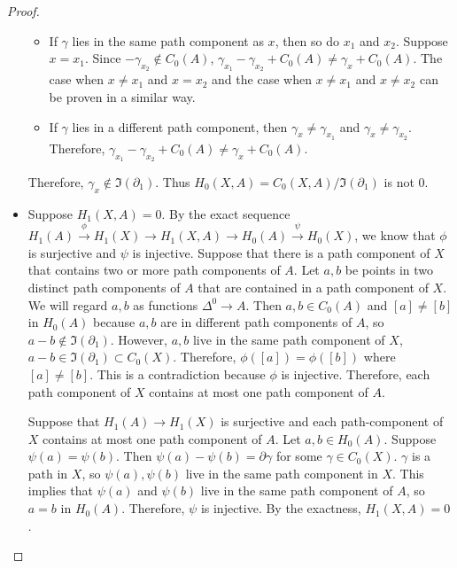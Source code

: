 \documentclass[12pt, psamsfonts]{amsart}
\theoremstyle{definition}
\theoremstyle{remark}
\numberwithin{equation}{section}
\begin{document}
\begin{proof}
\begin{itemize}
      \begin{itemize}
        \item
          If $\gamma$ lies in the same path component as $x$, then so do $x_1$ and $x_2$.
          Suppose $x = x_1$.
          Since $-\gamma_{x_2} \notin C_0(A)$, $\gamma_{x_1} - \gamma_{x_2} + C_0(A) \ne \gamma_x + C_0(A)$.
          The case when $x \ne x_1$ and $x = x_2$ and the case when $x \ne x_1$ and $x \ne x_2$ can be proven in a similar way.
        \item
          If $\gamma$ lies in a different path component, then $\gamma_x \ne \gamma_{x_1}$ and $\gamma_x \ne \gamma_{x_2}$.
          Therefore, $\gamma_{x_1} - \gamma_{x_2} + C_0(A) \ne \gamma_x + C_0(A)$.
      \end{itemize}
      Therefore, $\gamma_x \notin \Im(\partial_1)$.
      Thus $H_0(X, A) = C_0(X, A) / \Im(\partial_1)$ is not 0.
    \item
      Suppose $H_1(X, A) = 0$.
      By the exact sequence $H_1(A) \xrightarrow{\phi} H_1(X) \rightarrow H_1(X, A) \rightarrow H_0(A) \xrightarrow{\psi} H_0(X)$, we know that $\phi$ is surjective and $\psi$ is injective.
      Suppose that there is a path component of $X$ that contains two or more path components of $A$.
      Let $a, b$ be points in two distinct path components of $A$ that are contained in a path component of $X$.
      We will regard $a, b$ as functions $\Delta^0 \rightarrow A$.
      Then $a, b \in C_0(A)$ and $[a] \ne [b]$ in $H_0(A)$ because $a, b$ are in different path components of $A$, so $a - b \notin \Im(\partial_1)$.
      However, $a, b$ live in the same path component of $X$, $a - b \in \Im(\partial_1) \subset C_0(X)$.
      Therefore, $\phi([a]) = \phi([b])$ where $[a] \ne [b]$.
      This is a contradiction because $\phi$ is injective.
      Therefore, each path component of $X$ contains at most one path component of $A$.

      Suppose that $H_1(A) \rightarrow H_1(X)$ is surjective and each path-component of $X$ contains at most one path component of $A$.
      Let $a, b \in H_0(A)$.
      Suppose $\psi(a) = \psi(b)$.
      Then $\psi(a) - \psi(b) = \partial \gamma$ for some $\gamma \in C_0(X)$.
      $\gamma$ is a path in $X$, so $\psi(a), \psi(b)$ live in the same path component in $X$.
      This implies that $\psi(a)$ and $\psi(b)$ live in the same path component of $A$, so $a = b$ in $H_0(A)$.
      Therefore, $\psi$ is injective.
      By the exactness, $H_1(X, A) = 0$.
  \end{itemize}
\end{proof}
\end{document}
